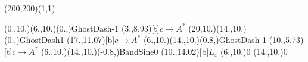 \unitlength=1bp%

\begin{feynartspicture}(200,200)(1,1)

\FADiagram{}
\FAProp(0.,10.)(6.,10.)(0.,){GhostDash}{-1}
\FALabel(3.,8.93)[t]{$c\to A^*$}
\FAProp(20,10.)(14.,10.)(0.,){GhostDash}{1}
\FALabel(17.,11.07)[b]{$c\to A^*$}
\FAProp(6.,10.)(14.,10.)(0.8,){GhostDash}{-1}
\FALabel(10.,5.73)[t]{$c\to A^*$}
\FAProp(6.,10.)(14.,10.)(-0.8,){BandSine}{0}
\FALabel(10.,14.02)[b]{$L_\varepsilon$}
\FAVert(6.,10.){0}
\FAVert(14.,10.){0}
\end{feynartspicture}

